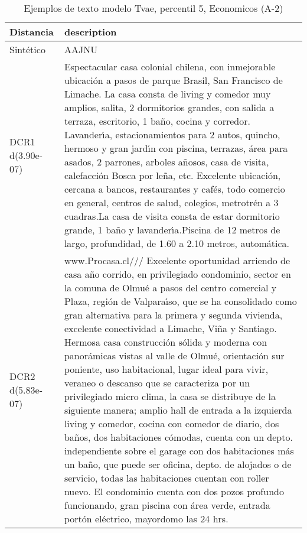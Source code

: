 \begin{table}[H]
\centering
\fontsize{10}{14}\selectfont
\caption{Ejemplos de texto modelo Tvae, percentil 5, Economicos (A-2)}
\label{table-example-economicos-a-2-tvae-5p-text}
\begin{tabular}{|l|m{35em}|}
\hline
\rowcolor[gray]{0.8}
Distancia & description \\
\hline Sintético & AAJNU \\
\hline DCR1 d(3.90e-07) & Espectacular casa colonial chilena, con inmejorable ubicaci\'on a pasos de parque Brasil, San Francisco de Limache. La casa consta de living y comedor muy amplios, salita, 2 dormitorios grandes, con salida a terraza, escritorio, 1 ba\~no, cocina y corredor. Lavander{\'\i}a, estacionamientos para 2 autos, quincho, hermoso y gran jard{\'\i}n con piscina, terrazas, \'area para asados, 2 parrones, arboles a\~nosos, casa de visita, calefacci\'on Bosca por le\~na, etc. Excelente ubicaci\'on, cercana a bancos, restaurantes y caf\'es, todo comercio en general, centros de salud, colegios, metrotr\'en a 3 cuadras.La casa de visita consta de estar dormitorio grande, 1 ba\~no y lavander{\'\i}a.Piscina de 12 metros de largo, profundidad, de 1.60 a 2.10 metros, autom\'atica. \\
\hline DCR2 d(5.83e-07) & www.Procasa.cl///    Excelente oportunidad arriendo de casa a\~no corrido, en privilegiado condominio, sector en la comuna de Olmu\'e a pasos del centro comercial y Plaza, regi\'on de Valpara{\'\i}so, que se ha consolidado como gran alternativa para la primera y segunda vivienda, excelente conectividad a Limache, Vi\~na y Santiago.    Hermosa casa construcci\'on s\'olida y moderna con panor\'amicas vistas al valle de Olmu\'e, orientaci\'on sur poniente, uso habitacional,  lugar ideal para vivir, veraneo o descanso que se caracteriza por un privilegiado micro clima, la casa se distribuye de la siguiente manera; amplio hall de entrada a la izquierda living y comedor, cocina con comedor de diario, dos ba\~nos,  dos habitaciones c\'omodas, cuenta con un depto. independiente sobre el garage con dos habitaciones m\'as un ba\~no, que puede ser oficina, depto. de alojados o de  servicio, todas las habitaciones cuentan con roller nuevo.     El condominio cuenta con dos pozos profundo funcionando, gran piscina con \'area verde, entrada port\'on el\'ectrico, mayordomo las 24 hrs. \\
\hline
\end{tabular}
\end{table}
